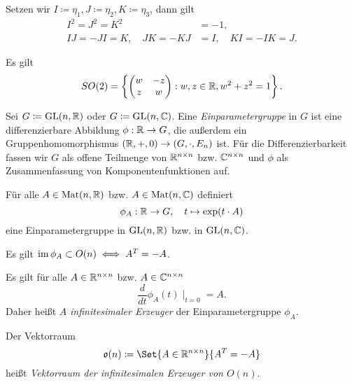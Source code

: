 \documentclass{cheat-sheet}
\DeclareMathOperator{\GL}{GL}
\DeclareMathOperator{\Mat}{Mat}
\begin{document}
\begin{defn}
  Setzen wir $I \coloneqq \eta_1, J \coloneqq \eta_2, K \coloneqq \eta_3$, dann gilt
  \begin{align*}
  I^2 = J^2 = K^2 &= -1, \\
  IJ = -JI = K, \quad JK = -KJ &= I, \quad KI = -IK = J.
  \end{align*}
\end{defn}

\begin{satz}
  Es gilt
  \[ SO(2) = \left\{ \begin{pmatrix} w & -z \\ z & w \end{pmatrix} : w, z \in \mathbb{R}, w^2 + z^2 = 1 \right\}. \]
\end{satz}


\begin{defn}
  Sei $G \coloneqq \GL(n, \R)$ oder $G \coloneqq \GL(n, \C)$. Eine \emph{Einparametergruppe} in $G$ ist eine differenzierbare Abbildung $\phi : \mathbb{R} \to G$, die außerdem ein Gruppenhomomorphismus $(\mathbb{R}, +, 0) \to (G, \cdot, E_n)$ ist. Für die Differenzierbarkeit fassen wir $G$ als offene Teilmenge von $\mathbb{R}^{n \times n}$ bzw. $\mathbb{C}^{n \times n}$ und $\phi$ als Zusammenfassung von Komponentenfunktionen auf.
\end{defn}

\begin{satz}
  Für alle $A \in \Mat(n, \R)$ bzw. $A \in \Mat(n, \C)$ definiert
  \[ \phi_A : \mathbb{R} \to G, \quad t \mapsto \exp(t \cdot A) \]
  eine Einparametergruppe in $\GL(n, \R)$ bzw. in $\GL(n, \C)$.
\end{satz}

\begin{satz}
  Es gilt $\operatorname{im} \phi_A \subset O(n) \iff A^T = -A$.
\end{satz}

\begin{bem}
  Es gilt für alle $A \in \mathbb{R}^{n \times n}$ bzw. $A \in \mathbb{C}^{n \times n}$
  \[ \frac{d}{dt} \phi_A(t) \mid_{t=0} = A. \]
  Daher heißt $A$ \emph{infinitesimaler Erzeuger} der Einparametergruppe $\phi_A$.
\end{bem}

\begin{defn}
  Der Vektorraum
  \[ \mathfrak{o}(n) \coloneqq \Set{ A \in \R^{n \times n} }{ A^T = - A } \]
  heißt \emph{Vektorraum der infinitesimalen Erzeuger von $O(n)$}.
\end{defn}
\end{document}
